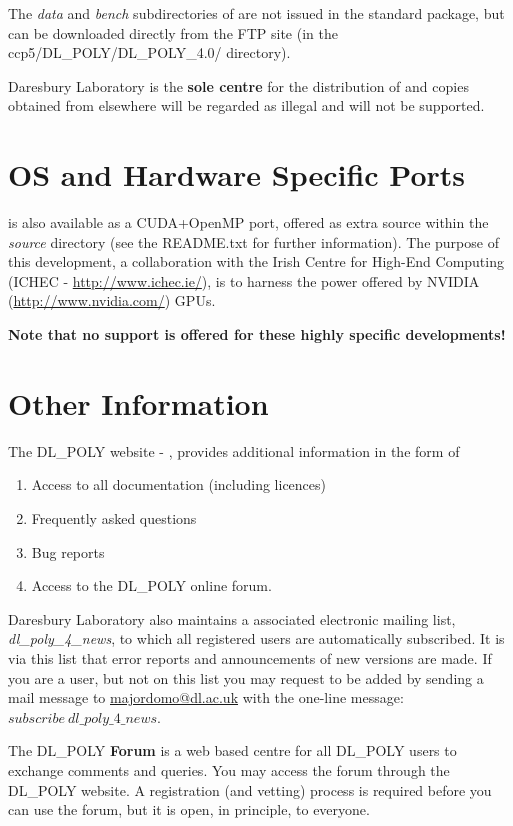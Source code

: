 The {\em data} and {\em bench} subdirectories of \D are not issued
in the standard package, but can be downloaded directly from the
FTP site (in the \mbox{ccp5/DL\_POLY/DL\_POLY\_4.0/} directory).

 Daresbury Laboratory is the {\bf sole centre} for
the distribution of \D and copies obtained from elsewhere will be
regarded as illegal and will not be supported.

\section{OS and Hardware Specific Ports}
%
%
\D is also available as a CUDA+OpenMP port, offered as extra
source within the {\em source} directory (see the README.txt
for further information).  The purpose of this development,
a collaboration with the Irish Centre for High-End Computing
(ICHEC - \href{http://www.ichec.ie/}{http://www.ichec.ie/}),
is to harness the power offered by NVIDIA\textregistered
(\href{http://www.nvidia.com/}{http://www.nvidia.com/}) GPUs.

{\bf Note that no support is offered for these highly specific
developments!}

\section{Other Information}\label{other}

The DL\_POLY website - \WEB{},
provides additional information in the form of
\begin{enumerate}
\item Access to all documentation (including licences)
\item Frequently asked questions
\item Bug reports
\item Access to the DL\_POLY online forum.
\end{enumerate}

\noindent
Daresbury Laboratory also maintains a \D associated electronic mailing
list, {\em dl\_poly\_4\_news}, to which all registered \D users
are automatically subscribed.  It is via this list that error reports
and announcements of new versions are made.  If you are a \D
user, but not on this list you may request to be added by sending
a mail message to {\href{mailto:majordomo@dl.ac.uk}{majordomo@dl.ac.uk}}
with the one-line message: $subscribe~dl\_poly\_4\_news$.

The DL\_POLY {\bf Forum} is a web based centre for all DL\_POLY users
to exchange comments and queries.  You may access the forum through the
DL\_POLY website.  A registration (and vetting) process is required
before you can use the forum, but it is open, in principle, to everyone.
